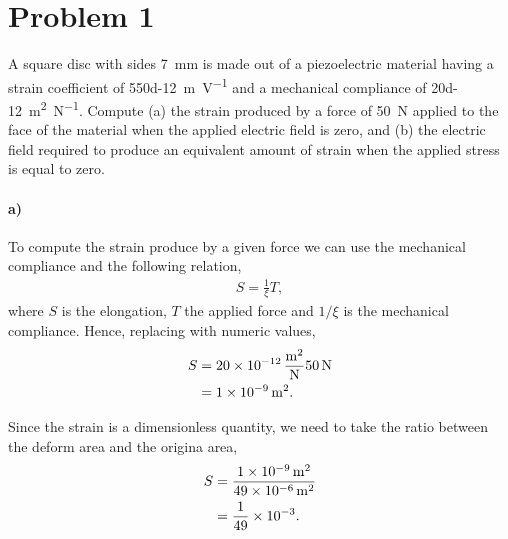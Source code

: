 \documentclass[../main.tex]{subfiles}
\begin{document}
\section{Problem 1}

A square disc with sides \SI{7}{\milli\meter} is made out of a piezoelectric material having a strain coefficient of \SI{550d-12}{\meter\per\volt} and a mechanical compliance of \SI{20d-12}{\meter\squared\per\newton}. 
Compute (a) the strain produced by a force of \SI{50}{\newton} applied to the face of the material when the applied electric field is zero, and (b) the electric field required to produce an equivalent amount of strain when the applied stress is equal to zero.


\paragraph{a)} To compute the strain produce by a given force we can use the mechanical compliance and the following relation,
\begin{gather*}
    S = \frac{1}{\xi}T,
\end{gather*}
where $S$ is the elongation, $T$ the applied force and $1/\xi$ is the mechanical compliance.
Hence, replacing with numeric values,
\begin{align*}
    S &= \SI[per-mode=fraction]{20d-12}{\meter\squared\per\newton}\SI{50}{\newton} \\
      &= \SI{1d-9}{\meter\squared}.
\end{align*}

Since the strain is a dimensionless quantity, we need to take the ratio between the deform area and the origina area,
\begin{align*}
    S &= \frac{\SI{1d-9}{\meter\squared}}{\SI{49d-6}{\meter\squared}} \\
      &= \frac{1}{49}\times\num{d-3}. 
\end{align*}
\end{document}
